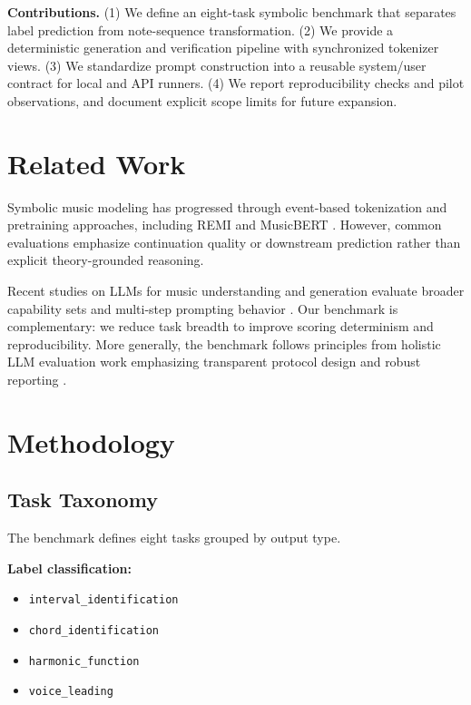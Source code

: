 \documentclass{article}
\begin{document}
\textbf{Contributions.}
(1) We define an eight-task symbolic benchmark that separates label prediction from note-sequence transformation.
(2) We provide a deterministic generation and verification pipeline with synchronized tokenizer views.
(3) We standardize prompt construction into a reusable system/user contract for local and API runners.
(4) We report reproducibility checks and pilot observations, and document explicit scope limits for future expansion.

\section{Related Work}
\label{sec:related_work}

Symbolic music modeling has progressed through event-based tokenization and pretraining approaches, including REMI and MusicBERT \cite{huang2020pop,huang2021musicbert}. However, common evaluations emphasize continuation quality or downstream prediction rather than explicit theory-grounded reasoning.

Recent studies on LLMs for music understanding and generation evaluate broader capability sets and multi-step prompting behavior \cite{zhou2024llmsmusicreason}. Our benchmark is complementary: we reduce task breadth to improve scoring determinism and reproducibility. More generally, the benchmark follows principles from holistic LLM evaluation work emphasizing transparent protocol design and robust reporting \cite{liang2023holistic}.

\section{Methodology}
\label{sec:design}

\subsection{Task Taxonomy}

The benchmark defines eight tasks grouped by output type.

\textbf{Label classification:}
\begin{itemize}
    \item \texttt{interval\_identification}
    \item \texttt{chord\_identification}
    \item \texttt{harmonic\_function}
    \item \texttt{voice\_leading}
\end{itemize}
\end{document}
